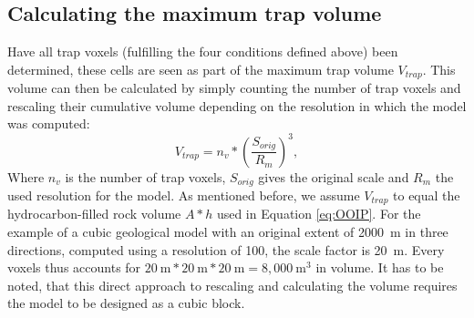 			\subsection{Calculating the maximum trap volume}
			Have all trap voxels (fulfilling the four conditions defined above) been determined, these cells are seen as part of the maximum trap volume $V_{trap}$. This volume can then be calculated by simply counting the number of trap voxels and rescaling their cumulative volume depending on the resolution in which the model was computed:
			\begin{equation}
			V_{trap} = n_v*(\frac{S_{orig}}{R_{m}})^3,
			\end{equation}
			Where $n_v$ is the number of trap voxels, $S_{orig}$ gives the original scale and $R_m$ the used resolution for the model. As mentioned before, we assume $V_{trap}$ to equal the hydrocarbon-filled rock volume $A * h$ used in Equation \ref{eq:OOIP}. 
			For the example of a cubic geological model with an original extent of 2000~m in three directions, computed using a resolution of 100, the scale factor is 20~m. Every voxels thus accounts for $20~\text{m}*20~\text{m}*20~\text{m}=8,000~\text{m}^3$ in volume. It has to be noted, that this direct approach to rescaling and calculating the volume requires the model to be designed as a cubic block.\\
		

